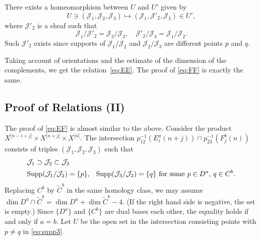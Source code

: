 \documentclass[12pt]{amsart}
\newcommand{\cal}{\mathcal}
\theoremstyle{definition}
\theoremstyle{remark}
\numberwithin{equation}{section}
\newcommand{\Hilb}[2]{{#1}^{\lbrack{#2}\rbrack}} %
\newcommand{\HilbX}[1]{\Hilb{X}{#1}}
\newcommand{\idl}{\cal J} %
\newcommand{\Supp}{\operatorname{Supp}} %
\begin{document}
There exists a homeomorphism between $U$ and $U'$ given by
\begin{equation*}
  U\ni (\idl_1, \idl_2, \idl_3) \mapsto (\idl_1, \idl'_2, \idl_3) \in U',
\end{equation*}
where $\idl'_2$ is a sheaf such that
\begin{equation*}
  \idl_1 / \idl'_2 = \idl_2 / \idl_3, \quad
  \idl'_2 / \idl_3 = \idl_1 / \idl_2.
\end{equation*}
Such $\idl'_2$ exists since supports of $\idl_1 / \idl_2$ and
$\idl_2 / \idl_3$ are different points $p$ and $q$.

Taking account of orientations and the estimate of the dimension of
the complements, we get the relation~\eqref{eq:EE}. The proof of
\eqref{eq:FF} is exactly the same.
%
\subsection{Proof of Relations (II)}
%
The proof of \eqref{eq:EF} is almost similar to the above.
Consider the product $\HilbX{n-i+j}\times\HilbX{n+j}\times\HilbX{n}$.
The intersection $p_{12}^{-1}(E_i^a(n+j))\cap p_{23}^{-1}(F_j^b(n))$
consists of triples $(\idl_1, \idl_2, \idl_3)$ such that
\begin{align}
  & \idl_1\supset\idl_2\subset\idl_3 \label{eq:incl3}\\
  & \text{$\Supp(\idl_1/\idl_2) = \{p\}$, \;
    $\Supp(\idl_3/\idl_2) = \{q\}$ for some $p\in D^a$, $q\in C^b$.}
 \label{eq:supp3}
\end{align}
Replacing $C^b$ by $\widetilde C^b$ in the same homology class, we may
assume
$\dim D^a\cap \widetilde C^b = \dim D^a + \dim \widetilde C^b - 4$.
(If the right hand side is negative, the set is empty.)
Since $\{D^a\}$ and $\{C^b\}$ are dual bases each other, the equality
holds if and only if $a = b$.
Let $U$ be the open set in the intersection consisting points
with $p\ne q$ in \eqref{eq:supp3}.
\end{document}
